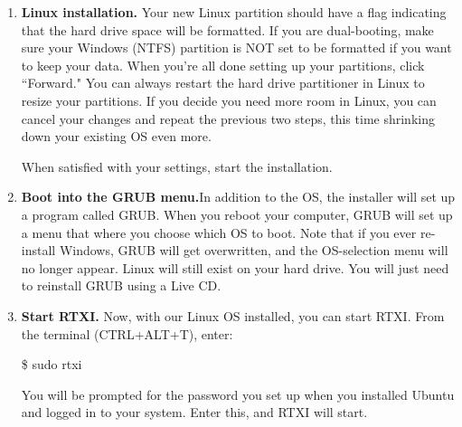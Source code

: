 \begin{enumerate}
\item \textbf{Linux installation.} Your new Linux partition should have a flag indicating that the hard drive space will be formatted. If you are dual-booting, make sure your Windows (NTFS) partition is NOT set to be formatted if you want to keep your data. When you're all done setting up your partitions, click ``Forward." You can always restart the hard drive partitioner in Linux to resize your partitions. If you decide you need more room in Linux, you can cancel your changes and repeat the previous two steps, this time shrinking down your existing OS even more. 

When satisfied with your settings, start the installation. 

\item \textbf{Boot into the GRUB menu.}In addition to the OS, the installer will set up a program called GRUB. When you reboot your computer, GRUB will set up a menu that where you choose which OS to boot. Note that if you ever re-install Windows, GRUB will get overwritten, and the OS-selection menu will no longer appear. Linux will still exist on your hard drive. You will just need to reinstall GRUB using a Live CD.

\item \textbf{Start RTXI.} Now, with our Linux OS installed, you can start RTXI. From the terminal (CTRL+ALT+T), enter:
\begin{example}
\$ sudo rtxi
\end{example}

You will be prompted for the password you set up when you installed Ubuntu and logged in to your system. Enter this, and RTXI will start. 

\end{enumerate}